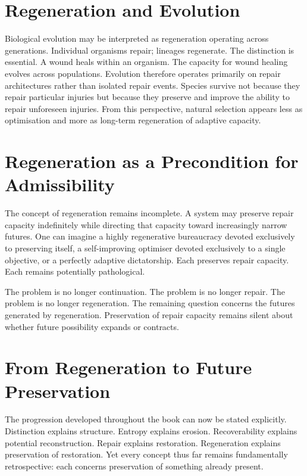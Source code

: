 \documentclass[12pt,twoside,openright]{book}
\begin{document}
\section{Regeneration and Evolution}
\label{sec:ch11-evolution}

Biological evolution may be interpreted as regeneration
operating across generations. Individual organisms repair;
lineages regenerate. The distinction is essential. A wound
heals within an organism. The capacity for wound healing
evolves across populations. Evolution therefore operates
primarily on repair architectures rather than isolated
repair events. Species survive not because they repair
particular injuries but because they preserve and improve
the ability to repair unforeseen injuries. From this
perspective, natural selection appears less as optimisation
and more as long-term regeneration of adaptive capacity.

\section{Regeneration as a Precondition for Admissibility}
\label{sec:ch11-precondition}

The concept of regeneration remains incomplete. A system
may preserve repair capacity indefinitely while directing
that capacity toward increasingly narrow futures. One can
imagine a highly regenerative bureaucracy devoted
exclusively to preserving itself, a self-improving
optimiser devoted exclusively to a single objective, or a
perfectly adaptive dictatorship. Each preserves repair
capacity. Each remains potentially pathological.

The problem is no longer continuation. The problem is no
longer repair. The problem is no longer regeneration. The
remaining question concerns the futures generated by
regeneration. Preservation of repair capacity remains
silent about whether future possibility expands or
contracts.

\section{From Regeneration to Future Preservation}
\label{sec:ch11-toward-future}

The progression developed throughout the book can now be
stated explicitly. Distinction explains structure. Entropy
explains erosion. Recoverability explains potential
reconstruction. Repair explains restoration. Regeneration
explains preservation of restoration. Yet every concept
thus far remains fundamentally retrospective: each concerns
preservation of something already present.
\end{document}
